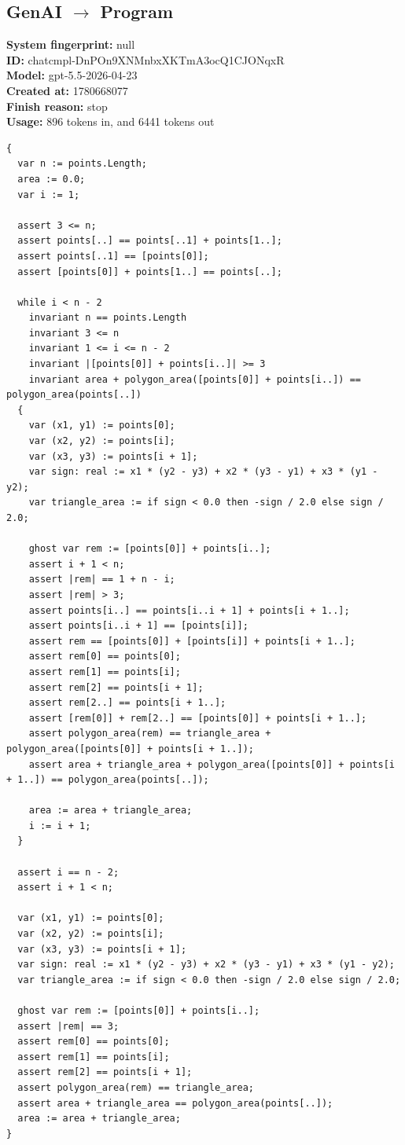\documentclass{article}
\begin{document}
\subsection*{GenAI $\rightarrow$ Program}
\textbf{System fingerprint: }null
\\\textbf{ID: }chatcmpl-DnPOn9XNMnbxXKTmA3ocQ1CJONqxR
\\\textbf{Model: }gpt-5.5-2026-04-23
\\\textbf{Created at: }1780668077
\\\textbf{Finish reason: }stop
\\\textbf{Usage: }896 tokens in, and 6441 tokens out
\begin{lstlisting}
{
  var n := points.Length;
  area := 0.0;
  var i := 1;

  assert 3 <= n;
  assert points[..] == points[..1] + points[1..];
  assert points[..1] == [points[0]];
  assert [points[0]] + points[1..] == points[..];

  while i < n - 2
    invariant n == points.Length
    invariant 3 <= n
    invariant 1 <= i <= n - 2
    invariant |[points[0]] + points[i..]| >= 3
    invariant area + polygon_area([points[0]] + points[i..]) == polygon_area(points[..])
  {
    var (x1, y1) := points[0];
    var (x2, y2) := points[i];
    var (x3, y3) := points[i + 1];
    var sign: real := x1 * (y2 - y3) + x2 * (y3 - y1) + x3 * (y1 - y2);
    var triangle_area := if sign < 0.0 then -sign / 2.0 else sign / 2.0;

    ghost var rem := [points[0]] + points[i..];
    assert i + 1 < n;
    assert |rem| == 1 + n - i;
    assert |rem| > 3;
    assert points[i..] == points[i..i + 1] + points[i + 1..];
    assert points[i..i + 1] == [points[i]];
    assert rem == [points[0]] + [points[i]] + points[i + 1..];
    assert rem[0] == points[0];
    assert rem[1] == points[i];
    assert rem[2] == points[i + 1];
    assert rem[2..] == points[i + 1..];
    assert [rem[0]] + rem[2..] == [points[0]] + points[i + 1..];
    assert polygon_area(rem) == triangle_area + polygon_area([points[0]] + points[i + 1..]);
    assert area + triangle_area + polygon_area([points[0]] + points[i + 1..]) == polygon_area(points[..]);

    area := area + triangle_area;
    i := i + 1;
  }

  assert i == n - 2;
  assert i + 1 < n;

  var (x1, y1) := points[0];
  var (x2, y2) := points[i];
  var (x3, y3) := points[i + 1];
  var sign: real := x1 * (y2 - y3) + x2 * (y3 - y1) + x3 * (y1 - y2);
  var triangle_area := if sign < 0.0 then -sign / 2.0 else sign / 2.0;

  ghost var rem := [points[0]] + points[i..];
  assert |rem| == 3;
  assert rem[0] == points[0];
  assert rem[1] == points[i];
  assert rem[2] == points[i + 1];
  assert polygon_area(rem) == triangle_area;
  assert area + triangle_area == polygon_area(points[..]);
  area := area + triangle_area;
}
\end{lstlisting}
\end{document}
